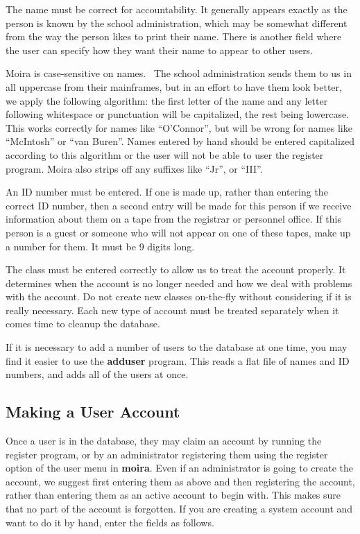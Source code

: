 The name must be correct for accountability.  It generally appears
exactly as the person is known by the school administration, which may
be somewhat different from the way the person likes to print their
name.  There is another field where the user can specify how they want
their name to appear to other users.

\label{namecaps}
Moira is case-sensitive on names.  \athena\ The school administration sends
them to us in all uppercase from their mainframes, but in an effort to
have them look better, we apply the following algorithm: the first
letter of the name and any letter following whitespace or punctuation
will be capitalized, the rest being lowercase.  This works correctly
for names like ``O'Connor'', but will be wrong for names like ``McIntosh''
or ``van Buren''.  Names entered by hand should be entered capitalized
according to this algorithm or the user will not be able to user the
register program.  Moira also strips off any suffixes like ``Jr'', or
``III''.

An ID number must be entered.  If one is made up, rather than entering
the correct ID number, then a second entry will be made for this
person if we receive information about them on a tape from the
registrar or personnel office.  If this person is a guest or someone
who will not appear on one of these tapes, make up a number for them.
It must be 9 digits long.

The class must be entered correctly to allow us to treat the account
properly.  It determines when the account is no longer needed and how
we deal with problems with the account.  Do not create new classes
on-the-fly without considering if it is really necessary.  Each new
type of account must be treated separately when it comes time to
cleanup the database.

If it is necessary to add a number of users to the database at one
time, you may find it easier to use the {\bf adduser} program.  This
reads a flat file of names and ID numbers, and adds all of the users
at once.

\subsection{Making a User Account}

Once a user is in the database, they may claim an account by running
the register program, or by an administrator registering them using
the register option of the user menu in {\bf moira}.  Even if an
administrator is going to create the account, we suggest first
entering them as above and then registering the account, rather than
entering them as an active account to begin with.  This makes sure
that no part of the account is forgotten.  If you are creating a
system account and want to do it by hand, enter the fields as follows.

